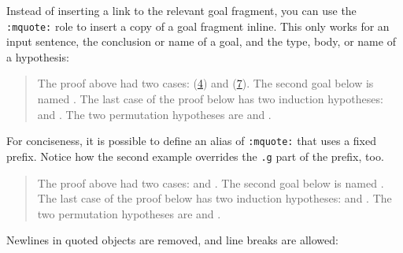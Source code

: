 \documentclass[a4paper]{article}
\begin{document}
Instead of inserting a link to the relevant goal fragment, you can use the \texttt{:mquote:} role to insert a copy of a goal fragment inline. This only works for an input sentence, the conclusion or name of a goal, and the type, body, or name of a hypothesis:

\begin{quote}
The proof above had two cases:  (\hyperref[references-rst-s-destruct-n-g-1-h-n-0-0]{4}) and  (\hyperref[references-rst-s-destruct-n-g-s-n0-h-n-s-0]{7}).
The second goal below is named .
The last case of the proof below has two induction hypotheses:  and . The two permutation hypotheses are  and .
\end{quote}

For conciseness, it is possible to define an alias of \texttt{:mquote:} that uses a fixed prefix.  Notice how the second example overrides the \texttt{.g} part of the prefix, too.

\begin{quote}
The proof above had two cases:  and .
The second goal below is named .
The last case of the proof below has two induction hypotheses:  and .
The two permutation hypotheses are  and .
\end{quote}

Newlines in quoted objects are removed, and line breaks are allowed:
\end{document}

